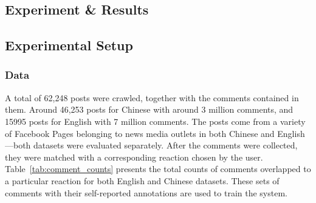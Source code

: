 \documentclass[12pt,a4paper]{report}
\theoremstyle{definition}
\begin{document}
\begin{CJK}{UTF8}{bsmi}

\chapter{Experiment \& Results}
    
    \section{Experimental Setup}
    \subsection{Data}
        \par A total of 62,248 posts were crawled, together with the comments contained in them. Around 46,253 posts for Chinese with around 3 million comments, and 15995 posts for English with 7 million comments. The posts come from a variety of Facebook Pages belonging to news media outlets in both Chinese and English—both datasets were evaluated separately. After the comments were collected, they were matched with a corresponding reaction chosen by the user. Table~\ref{tab:comment_counts} presents the total counts of comments overlapped to a particular reaction for both English and Chinese datasets. These sets of comments with their self-reported annotations are used to train the system.
        

\end{CJK}
\end{document}
